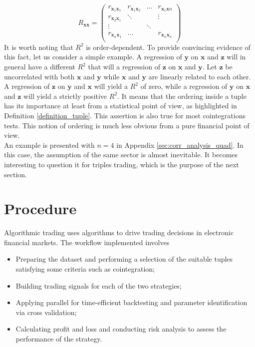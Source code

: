 \documentclass[11pt,a4,twosided,singlespacing,titlepagenumber=on]{scrreprt}
\numberwithin{equation}{chapter} %
\theoremstyle{remark}
\newcommand{\matr}[1]{\mathbf{#1}}
\begin{document}
\begin{equation}
R_{\matr{x}\matr{x}} =\begin{pmatrix}
r_{\matr{x}_1\matr{x}_1}    & r_{\matr{x}_1\matr{x}_2} & ...  & r_{\matr{x}_1\matr{x}n}  \\
r_{\matr{x}_2\matr{x}_1}    & \ddots &   & \vdots  \\
\vdots       &   & \ddots &   \\
r_{\matr{x}_n\matr{x}_1}    & \hdots &   & r_{\matr{x}_n\matr{x}_n} \label{rxx} \\
\end{pmatrix} 
\end{equation}
It is worth noting that $R^2$ is order-dependent. To provide convincing evidence of this fact, let us consider a simple example. A regression of $\matr{y}$ on $\matr{x}$ and $\matr{z}$ will in general have a different $R^2$ that will a regression of $\matr{z}$ on $\matr{x}$ and $\matr{y}$. Let $\matr{z}$ be uncorrelated with both $\matr{x}$ and $\matr{y}$ while $\matr{x}$ and $\matr{y}$ are linearly related to each other. A regression of $\matr{z}$ on $\matr{y}$ and $\matr{x}$ will yield a $R^2$ of zero, while a regression of $\matr{y}$ on $\matr{x}$ and $\matr{z}$ will yield a strictly positive $R^2$. It means that the ordering inside a tuple has its importance at least from a statistical point of view, as highlighted in Definition \ref{definition_tuple}. This assertion is also true for most cointegrations tests. This notion of ordering is much less obvious from a pure financial point of view. \\

An example is presented with $n=4$ in Appendix \ref{sec:corr_analysis_quad}. In this case, the assumption of the same sector is almost inevitable. It becomes interesting to question it for triples trading, which is the purpose of the next section.

\chapter{Procedure}
Algorithmic trading uses algorithms to drive trading decisions in electronic financial markets. The workflow implemented involves
\begin{itemize}
\item Preparing the dataset and performing a selection of the suitable tuples satisfying some criteria such as cointegration;
\item Building trading signals for each of the two strategies;
\item Applying parallel for time-efficient backtesting and parameter identification via cross validation;
\item Calculating profit and loss and conducting risk analysis to assess the performance of the strategy. 
\end{itemize}
\end{document}
